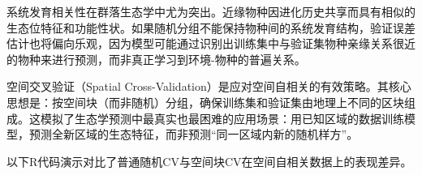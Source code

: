 \documentclass[
  twoside,12pt,fontset=none]{ctexbook}
\newenvironment{Shaded}{\begin{snugshade}}{\end{snugshade}}
\newcommand{\AttributeTok}[1]{\textcolor[rgb]{0.13,0.29,0.53}{#1}}
\newcommand{\CommentTok}[1]{\textcolor[rgb]{0.56,0.35,0.01}{\textit{#1}}}
\newcommand{\ControlFlowTok}[1]{\textcolor[rgb]{0.13,0.29,0.53}{\textbf{#1}}}
\newcommand{\DecValTok}[1]{\textcolor[rgb]{0.00,0.00,0.81}{#1}}
\newcommand{\FunctionTok}[1]{\textcolor[rgb]{0.13,0.29,0.53}{\textbf{#1}}}
\newcommand{\NormalTok}[1]{#1}
\newcommand{\OtherTok}[1]{\textcolor[rgb]{0.56,0.35,0.01}{#1}}
\newcommand{\SpecialCharTok}[1]{\textcolor[rgb]{0.81,0.36,0.00}{\textbf{#1}}}
\newcommand{\StringTok}[1]{\textcolor[rgb]{0.31,0.60,0.02}{#1}}
\begin{document}
系统发育相关性在群落生态学中尤为突出。近缘物种因进化历史共享而具有相似的生态位特征和功能性状。如果随机分组不能保持物种间的系统发育结构，验证误差估计也将偏向乐观，因为模型可能通过识别出训练集中与验证集物种亲缘关系很近的物种来进行预测，而非真正学习到环境-物种的普遍关系。

空间交叉验证（Spatial Cross-Validation）是应对空间自相关的有效策略。其核心思想是：按空间块（而非随机）分组，确保训练集和验证集由地理上不同的区块组成。这模拟了生态学预测中最真实也最困难的应用场景：用已知区域的数据训练模型，预测全新区域的生态特征，而非预测``同一区域内新的随机样方''。

以下R代码演示对比了普通随机CV与空间块CV在空间自相关数据上的表现差异。

\begin{Shaded}
\end{Shaded}
\end{document}
